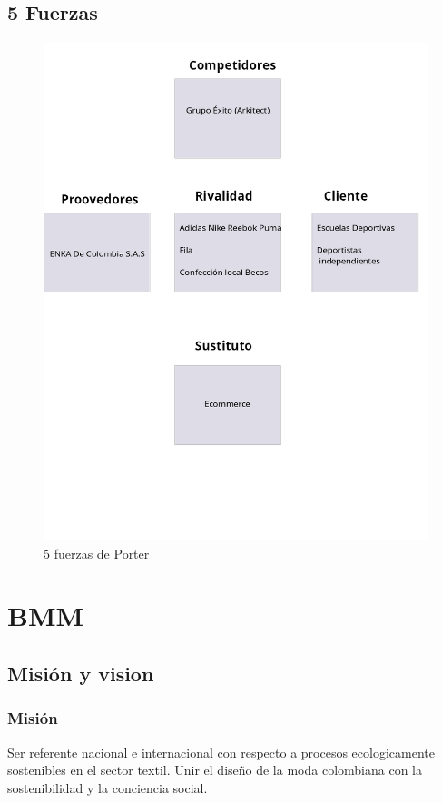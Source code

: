 \documentclass[11pt]{article}
\begin{document}
\subsection{5 Fuerzas}
\label{sec:org7915404}
\begin{figure}[H]
\centering
\includegraphics[width=.9\linewidth]{./assets/build/5_fuerzas.png}
\caption{\label{fig:orge49e3f4}5 fuerzas de Porter}
\end{figure}

\section{BMM}
\label{sec:orgbe8d077}
\subsection{Misión y vision}
\label{sec:org0a61fe2}
\subsubsection{Misión}
\label{sec:org5715524}
Ser referente nacional e internacional con respecto
a procesos ecologicamente sostenibles en el sector
textil. Unir el diseño de la moda colombiana
con la sostenibilidad y la conciencia social.
\end{document}
